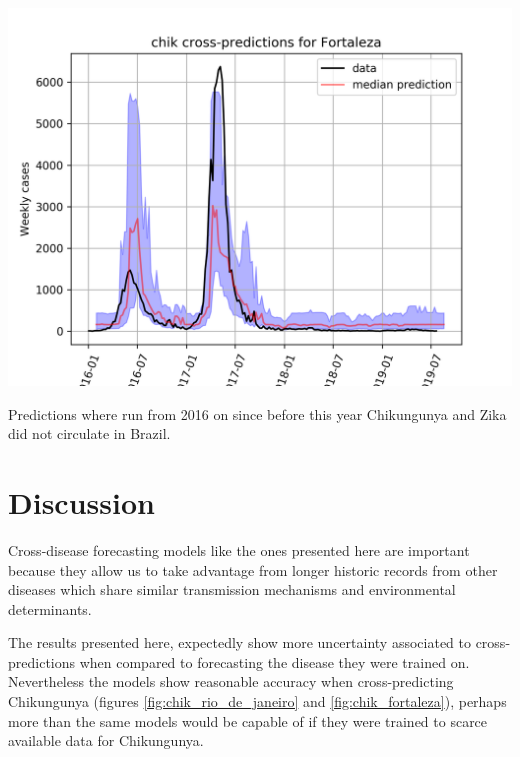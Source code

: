 \documentclass[a0,portrait]{a0poster}
\begin{document}
\begin{multicols}{3}
\begin{center}\vspace{1cm}
\includegraphics[width=0.9\linewidth]{figures/qf_chik_cross_Fortaleza.png} 
\label{fig:chik_fortaleza}
\end{center}%

Predictions where run from 2016 on since before this year Chikungunya and Zika 
did not circulate in Brazil. 

\section*{Discussion}
Cross-disease forecasting models like the ones presented here are important 
because they allow us to take advantage from longer historic records from other 
diseases which share similar transmission mechanisms and environmental 
determinants.

The results presented here, expectedly show more uncertainty associated to 
cross-predictions when compared to forecasting the disease they were trained 
on. Nevertheless the models show reasonable accuracy when cross-predicting 
Chikungunya (figures \ref{fig:chik_rio_de_janeiro} and 
\ref{fig:chik_fortaleza}), perhaps more than the same models would be capable of 
if they were trained to scarce available data for Chikungunya.


\end{multicols}
\end{document}
